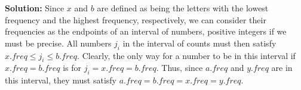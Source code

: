 \documentclass[11pts]{article}
\begin{document}
\begin{enumerate}
  \textbf{Solution:} Since $x$ and $b$ are defined as being the letters with
  the lowest frequency and the highest frequency, respectively, we can consider
  their frequencies as the endpoints of an interval of numbers,
  positive integers if we
  must be precise. All numbers $j_i$ in the interval of counts must then
  satisfy $x.freq \le j_i \le b.freq $. Clearly, the only way for a number to
  be in this interval if $x.freq = b.freq$ is for $j_i = x.freq = b.freq$.
  Thus, since $a.freq$ and $y.freq$ are in this interval, they must satisfy
  $a.freq = b.freq = x.freq = y.freq$. \\

\end{enumerate}
\end{document}
